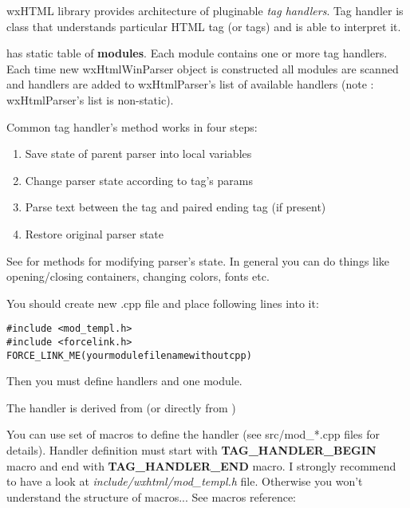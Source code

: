 \label{handlers}

wxHTML library provides architecture of pluginable {\it tag handlers}.
Tag handler is class that understands particular HTML tag (or tags) and is
able to interpret it.

 has static table of {\bf modules}.
Each module contains one or more tag handlers. Each time new wxHtmlWinParser
object is constructed all modules are scanned and handlers are added
to wxHtmlParser's list of available handlers (note : wxHtmlParser's list
is non-static).


Common tag handler's  method
works in four steps:

\begin{enumerate}
\item Save state of parent parser into local variables
\item Change parser state according to tag's params
\item Parse text between the tag and paired ending tag (if present)
\item Restore original parser state
\end{enumerate}

See  for methods for modifying
parser's state. In general you can do things like opening/closing containers,
changing colors, fonts etc.


You should create new .cpp file and place following lines into it: 

\begin{verbatim}
#include <mod_templ.h>
#include <forcelink.h>
FORCE_LINK_ME(yourmodulefilenamewithoutcpp)
\end{verbatim}

Then you must define handlers and one module.


The handler is derived from 
(or directly from )

You can use set of macros to define the handler (see src/mod_*.cpp files
for details). Handler definition must start with {\bf TAG_HANDLER_BEGIN} macro
and end with {\bf TAG_HANDLER_END} macro. I strongly recommend to have a look
at {\it include/wxhtml/mod_templ.h} file. Otherwise you won't understand
the structure of macros... See macros reference:

